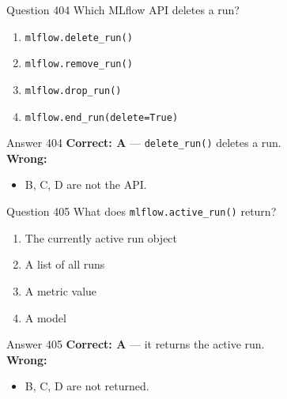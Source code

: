 \documentclass[aspectratio=169,11pt]{beamer}
\begin{document}
	\begin{frame}{Question 404}
		Which MLflow API deletes a run?
		\begin{enumerate}[label=\Alph*.]
			\item \texttt{mlflow.delete\_run()}
			\item \texttt{mlflow.remove\_run()}
			\item \texttt{mlflow.drop\_run()}
			\item \texttt{mlflow.end\_run(delete=True)}
		\end{enumerate}
	\end{frame}
	\begin{frame}{Answer 404}
		\textbf{Correct: A} --- \texttt{delete\_run()} deletes a run.\\
		\vspace{0.5em}
		\textbf{Wrong:}
		\begin{itemize}
			\item B, C, D are not the API.
		\end{itemize}
	\end{frame}
	
	\begin{frame}{Question 405}
		What does \texttt{mlflow.active\_run()} return?
		\begin{enumerate}[label=\Alph*.]
			\item The currently active run object
			\item A list of all runs
			\item A metric value
			\item A model
		\end{enumerate}
	\end{frame}
	\begin{frame}{Answer 405}
		\textbf{Correct: A} --- it returns the active run.\\
		\vspace{0.5em}
		\textbf{Wrong:}
		\begin{itemize}
			\item B, C, D are not returned.
		\end{itemize}
	\end{frame}
	
\end{document}
